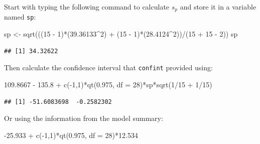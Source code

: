 \documentclass[
]{book}
\newenvironment{Shaded}{\begin{snugshade}}{\end{snugshade}}
\newcommand{\AttributeTok}[1]{\textcolor[rgb]{0.77,0.63,0.00}{#1}}
\newcommand{\DecValTok}[1]{\textcolor[rgb]{0.00,0.00,0.81}{#1}}
\newcommand{\FloatTok}[1]{\textcolor[rgb]{0.00,0.00,0.81}{#1}}
\newcommand{\FunctionTok}[1]{\textcolor[rgb]{0.00,0.00,0.00}{#1}}
\newcommand{\NormalTok}[1]{#1}
\newcommand{\OtherTok}[1]{\textcolor[rgb]{0.56,0.35,0.01}{#1}}
\newcommand{\SpecialCharTok}[1]{\textcolor[rgb]{0.00,0.00,0.00}{#1}}
\begin{document}
Start with typing the following command to calculate \(s_p\) and store it in a
variable named \texttt{sp}:

\begin{Shaded}
\begin{Highlighting}[]
\NormalTok{sp }\OtherTok{\textless{}{-}} \FunctionTok{sqrt}\NormalTok{(((}\DecValTok{15} \SpecialCharTok{{-}} \DecValTok{1}\NormalTok{)}\SpecialCharTok{*}\NormalTok{(}\FloatTok{39.36133}\SpecialCharTok{\^{}}\DecValTok{2}\NormalTok{) }\SpecialCharTok{+}\NormalTok{ (}\DecValTok{15} \SpecialCharTok{{-}} \DecValTok{1}\NormalTok{)}\SpecialCharTok{*}\NormalTok{(}\FloatTok{28.4124}\SpecialCharTok{\^{}}\DecValTok{2}\NormalTok{))}\SpecialCharTok{/}\NormalTok{(}\DecValTok{15} \SpecialCharTok{+} \DecValTok{15} \SpecialCharTok{{-}} \DecValTok{2}\NormalTok{))}
\NormalTok{sp}
\end{Highlighting}
\end{Shaded}

\begin{verbatim}
## [1] 34.32622
\end{verbatim}

Then calculate the confidence interval that \texttt{confint} provided using:

\begin{Shaded}
\begin{Highlighting}[]
\FloatTok{109.8667} \SpecialCharTok{{-}} \FloatTok{135.8} \SpecialCharTok{+} \FunctionTok{c}\NormalTok{(}\SpecialCharTok{{-}}\DecValTok{1}\NormalTok{,}\DecValTok{1}\NormalTok{)}\SpecialCharTok{*}\FunctionTok{qt}\NormalTok{(}\FloatTok{0.975}\NormalTok{, }\AttributeTok{df =} \DecValTok{28}\NormalTok{)}\SpecialCharTok{*}\NormalTok{sp}\SpecialCharTok{*}\FunctionTok{sqrt}\NormalTok{(}\DecValTok{1}\SpecialCharTok{/}\DecValTok{15} \SpecialCharTok{+} \DecValTok{1}\SpecialCharTok{/}\DecValTok{15}\NormalTok{)}
\end{Highlighting}
\end{Shaded}

\begin{verbatim}
## [1] -51.6083698  -0.2582302
\end{verbatim}

Or using the information from the model summary:

\begin{Shaded}
\begin{Highlighting}[]
\SpecialCharTok{{-}}\FloatTok{25.933} \SpecialCharTok{+} \FunctionTok{c}\NormalTok{(}\SpecialCharTok{{-}}\DecValTok{1}\NormalTok{,}\DecValTok{1}\NormalTok{)}\SpecialCharTok{*}\FunctionTok{qt}\NormalTok{(}\FloatTok{0.975}\NormalTok{, }\AttributeTok{df =} \DecValTok{28}\NormalTok{)}\SpecialCharTok{*}\FloatTok{12.534}
\end{Highlighting}
\end{Shaded}
\end{document}
